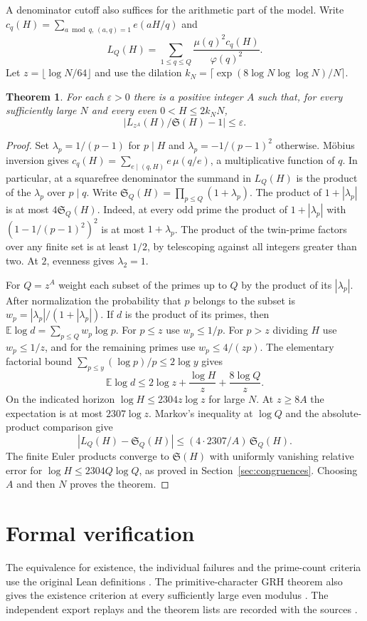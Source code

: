 \documentclass[11pt,a4paper]{article}
\newtheorem{theorem}{Theorem}[section]
\newcommand{\SSg}{\mathfrak S}
\begin{document}
A denominator cutoff also suffices for the arithmetic part of the model.
Write $c_q(H)=\sum_{a\bmod q,\,(a,q)=1}e(aH/q)$ and
\[
 L_Q(H)=\sum_{1\le q\le Q}\frac{\mu(q)^2c_q(H)}{\varphi(q)^2}.
\]
Let $z=\lfloor\log N/64\rfloor$ and use the dilation
$k_N=\lceil \exp(8\log N\log\log N)/N\rceil$.

\begin{theorem}\label{th:denominators}
For each $\varepsilon>0$ there is a positive integer $A$ such that,
for every sufficiently large $N$ and every even $0<H\le2k_NN$,
\[
             \left|L_{z^A}(H)/\SSg(H)-1\right|\le\varepsilon .
\]
\end{theorem}

\begin{proof}
Set $\lambda_p=1/(p-1)$ for $p\mid H$ and $\lambda_p=-1/(p-1)^2$
otherwise. M\"obius inversion gives
$c_q(H)=\sum_{e\mid(q,H)} e\,\mu(q/e)$, a multiplicative function of $q$.
In particular, at a squarefree denominator the summand in $L_Q(H)$
is the product of the $\lambda_p$ over $p\mid q$.
Write $\SSg_Q(H)=\prod_{p\le Q}(1+\lambda_p)$.
The product of $1+|\lambda_p|$ is at most $4\SSg_Q(H)$.
Indeed, at every odd prime the product of $1+|\lambda_p|$ with
$(1-1/(p-1)^2)^2$ is at most $1+\lambda_p$. The product of the twin-prime
factors over any finite set is at least $1/2$, by telescoping against all
integers greater than two. At $2$, evenness gives $\lambda_2=1$.

For $Q=z^A$ weight each subset of the primes up to $Q$ by the product of
its $|\lambda_p|$. After normalization the probability that $p$ belongs
to the subset is $w_p=|\lambda_p|/(1+|\lambda_p|)$. If $d$ is the
product of its primes, then $\mathbb E\log d=\sum_{p\le Q} w_p\log p$.
For $p\le z$ use $w_p\le1/p$. For $p>z$ dividing $H$ use $w_p\le1/z$,
and for the remaining primes use $w_p\le4/(zp)$. The elementary factorial
bound $\sum_{p\le y}(\log p)/p\le2\log y$ gives
\[
 \mathbb E\log d\le 2\log z+\frac{\log H}{z}+\frac{8\log Q}{z}.
\]
On the indicated horizon $\log H\le2304z\log z$ for large $N$.
At $z\ge8A$ the expectation is at most $2307\log z$.
Markov's inequality at $\log Q$ and the absolute-product comparison give
\[
       |L_Q(H)-\SSg_Q(H)|\le (4\cdot2307/A)\,\SSg_Q(H).
\]
The finite Euler products converge to $\SSg(H)$ with uniformly vanishing
relative error for $\log H\le2304Q\log Q$, as proved in
Section~\ref{sec:congruences}. Choosing $A$ and then $N$ proves the theorem.
\end{proof}

\section*{Formal verification}
The equivalence for existence, the individual failures and the prime-count criteria use the original Lean definitions \cite{LLLean,formal}. The primitive-character GRH theorem also gives the existence criterion at every sufficiently large even modulus \cite{grh,compact}. The independent export replays and the theorem lists are recorded with the sources \cite{formal}.
\end{document}
